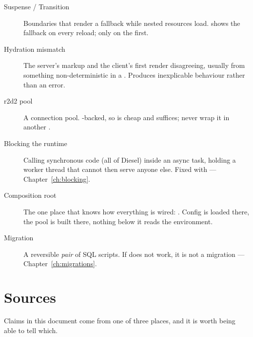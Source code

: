 \begin{description}
  \item[Suspense / Transition] Boundaries that render a fallback while nested resources load.
     shows the fallback on every reload;  only on the first.

  \item[Hydration mismatch] The server's markup and the client's first render disagreeing, usually
    from something non-deterministic in a . Produces inexplicable behaviour rather than
    an error.

  \item[r2d2 pool] A connection pool. -backed, so  is cheap and
     suffices; never wrap it in another .

  \item[Blocking the runtime] Calling synchronous code (all of Diesel) inside an async task, holding
    a worker thread that cannot then serve anyone else. Fixed with  ---
    Chapter~\ref{ch:blocking}.

  \item[Composition root] The one place that knows how everything is wired: . Config
    is loaded there, the pool is built there, nothing below it reads the environment.

  \item[Migration] A reversible \emph{pair} of SQL scripts. If  does not work, it is
    not a migration --- Chapter~\ref{ch:migrations}.
\end{description}

\chapter{Sources}

Claims in this document come from one of three places, and it is worth being able to tell which.


